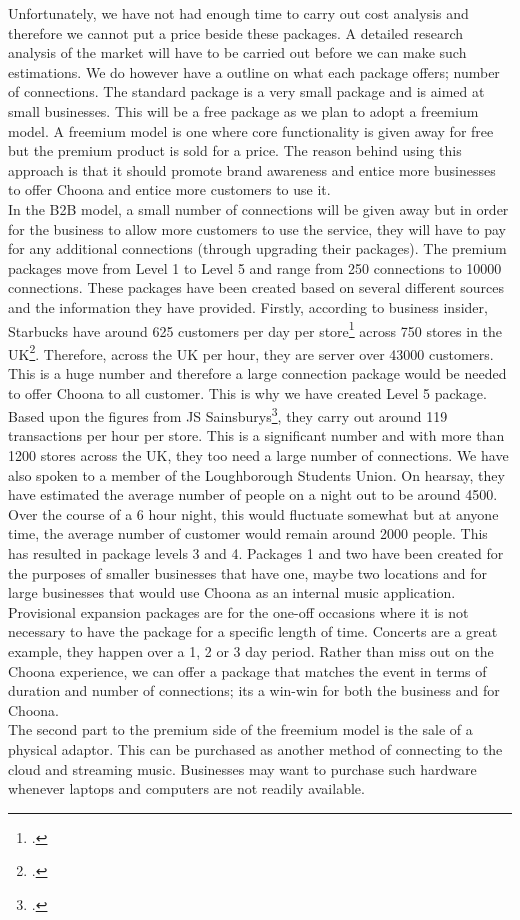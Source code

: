 Unfortunately, we have not had enough time to carry out cost analysis and therefore we cannot put a price beside these packages.  A detailed research analysis of the market will have to be carried out before we can make such estimations.  We do however have a outline on what each package offers; number of connections.  The standard package is a very small package and is aimed at small businesses.  This will be a free package as we plan to adopt a freemium model.  A freemium model is one where core functionality is given away for free but the premium product is sold for a price.  The reason behind using this approach is that it should promote brand awareness and entice more businesses to offer Choona and entice more customers to use it.  \\
In the B2B model, a small number of connections will be given away but in order for the business to allow more customers to use the service, they will have to pay for any additional connections (through upgrading their packages).  The premium packages move from Level 1 to Level 5 and range from 250 connections to 10000 connections. These packages have been created based on several different sources and the information they have provided.  Firstly, according to business insider, Starbucks have around 625 customers per day per store\footcite{starbucks} across 750 stores in the UK\footcite{starbucks_more}.  Therefore, across the UK per hour, they are server over 43000 customers.  This is a huge number and therefore a large connection package would be needed to offer Choona to all customer.  This is why we have created Level 5 package.  Based upon the figures from JS Sainsburys\footcite{sainsburys}, they carry out around 119 transactions per hour per store.  This is a significant number and with more than 1200 stores across the UK, they too need a large number of connections.  We have also spoken to a member of the Loughborough Students Union.  On hearsay, they have estimated the average number of people on a night out to be around 4500.  Over the course of a 6 hour night, this would fluctuate somewhat but at anyone time, the average number of customer would remain around 2000 people.  This has resulted in package levels 3 and 4.  Packages 1 and two have been created for the purposes of smaller businesses that have one, maybe two locations and for large businesses that would use Choona as an internal music application.  Provisional expansion packages are for the one-off occasions where it is not necessary to have the package for a specific length of time.  Concerts are a great example, they happen over a 1, 2 or 3 day period.  Rather than miss out on the Choona experience, we can offer a package that matches the event in terms of duration and number of connections; its a win-win for both the business and for Choona.\\
The second part to the premium side of the freemium model is the sale of a physical adaptor.  This can be purchased as another method of connecting to the cloud and streaming music.  Businesses may want to purchase such hardware whenever laptops and computers are not readily available. \\

